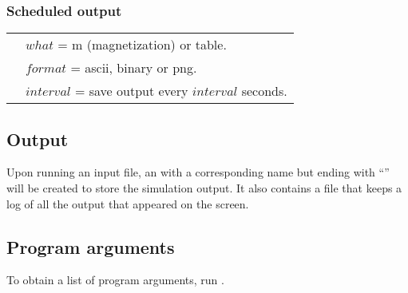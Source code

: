 \subsubsection*{Scheduled output}
\begin{tabular}{ll}
[what format interval]{autosave}  & $what$ = m (magnetization) or table.\\
& $format$ = ascii, binary or png.\\
& $interval$ = save output every $interval$ seconds.
\end{tabular}


\subsection{Output}


Upon running an input file, an  with a corresponding name but ending with ``'' will be created to store the simulation output. It also contains a file  that keeps a log of all the output that appeared on the screen.  


\subsection{Program arguments}\label{arguments}

To obtain a list of program arguments, run \prog {}.
